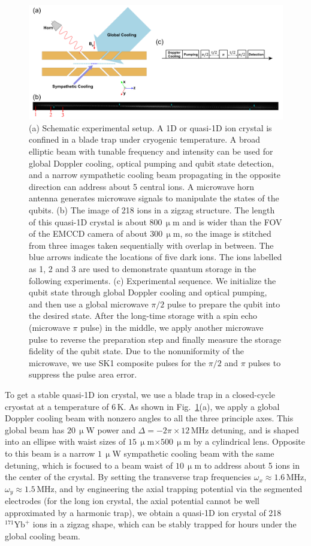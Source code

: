 \documentclass[aps,prl,reprint,superscriptaddress,twocolumn,longbibliography]{revtex4-1}
\begin{document}
\begin{figure}[!tbp]
  \centering
  \includegraphics[width=\linewidth]{Fig1.pdf}
  \caption{(a) Schematic experimental setup. A 1D or quasi-1D ion crystal is confined in a blade trap under cryogenic temperature. A broad elliptic beam with tunable frequency and intensity can be used for global Doppler cooling, optical pumping and qubit state detection, and a narrow sympathetic cooling beam propagating in the opposite direction can address about 5 central ions. A microwave horn antenna generates microwave signals to manipulate the states of the qubits. (b) The image of 218 ions in a zigzag structure. The length of this quasi-1D crystal is about $800\,\upmu$m and is wider than the FOV of the EMCCD camera of about $300\,\upmu$m, so the image is stitched from three images taken sequentially with overlap in between. The blue arrows indicate the locations of five dark ions. The ions labelled as 1, 2 and 3 are used to demonstrate quantum storage in the following experiments. (c) Experimental sequence. We initialize the qubit state through global Doppler cooling and optical pumping, and then use a global microwave $\pi/2$ pulse to prepare the qubit into the desired state. After the long-time storage with a spin echo (microwave $\pi$ pulse) in the middle, we apply another microwave pulse to reverse the preparation step and finally measure the storage fidelity of the qubit state. Due to the nonuniformity of the microwave, we use SK1 composite pulses for the $\pi/2$ and $\pi$ pulses to suppress the pulse area error. }\label{fig:setup}
\end{figure}

To get a stable quasi-1D ion crystal, we use a blade trap in a closed-cycle cryostat \cite{Pagano_2018} at a temperature of $6\,$K. As shown in Fig.~\ref{fig:setup}(a), we apply a global Doppler cooling beam with nonzero angles to all the three principle axes. This global beam has $20\,\upmu$W power and $\Delta=-2\pi\times 12\,$MHz detuning, and is shaped into an ellipse with waist sizes of $15\,\upmu$m$\times 500\,\upmu$m by a cylindrical lens. Opposite to this beam is a narrow $1\,\upmu$W sympathetic cooling beam with the same detuning, which is focused to a beam waist of $10\,\upmu$m to address about 5 ions in the center of the crystal. By setting the transverse trap frequencies $\omega_x\approx 1.6\,$MHz, $\omega_y\approx 1.5\,$MHz, and by engineering the axial trapping potential via the segmented electrodes (for the long ion crystal, the axial potential cannot be well approximated by a harmonic trap), we obtain a quasi-1D ion crystal of 218 $^{171}\mathrm{Yb}^+$ ions in a zigzag shape, which can be stably trapped for hours under the global cooling beam.
\end{document}
